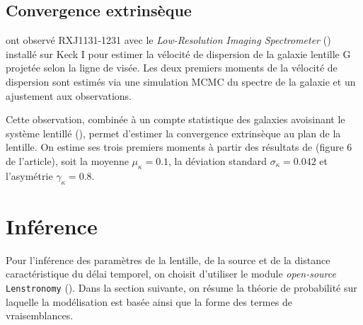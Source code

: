 \documentclass[times,10pt,twocolumn]{article}
\begin{document}


\subsection{Convergence extrinsèque}
\citet{Suyu2013} ont observé RXJ1131-1231 avec le \textit{Low-Resolution Imaging 
Spectrometer} (\citet{Oke1995}) installé sur Keck I 
pour estimer la vélocité de dispersion de la galaxie lentille G projetée 
selon la ligne de visée. Les deux premiers moments de la vélocité
de dispersion sont estimés via une simulation MCMC du spectre de la galaxie 
et un ajustement aux observations.


Cette observation, combinée à un compte statistique 
des galaxies avoisinant le système lentillé (\citet{Fassnacht2011}), permet d'estimer 
la convergence extrinsèque au plan de la lentille. On estime ses trois premiers 
moments à partir des résultats de \citet{Suyu2013} (figure 6 de l'article), 
soit la moyenne $\mu_{\kappa}=0.1$, la déviation standard $\sigma_\kappa=0.042$ et 
l'asymétrie $\gamma_\kappa=0.8$.


\section{Inférence}\label{sec:inference}
Pour l'inférence des paramètres de la lentille, de la source et 
de la distance caractéristique du délai temporel, on choisit d'utiliser 
le module \textit{open-source} \texttt{Lenstronomy} (\cite{Birrer2018}). Dans 
la section suivante, on résume la théorie de probabilité sur laquelle 
la modélisation est basée ainsi que la forme des termes de vraisemblances.
\end{document}
